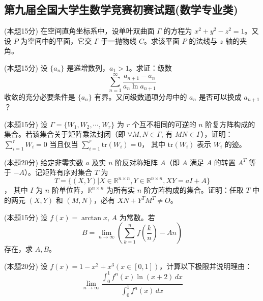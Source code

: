 \documentclass[loose]{ExBook}
\begin{document}
\subsection{第九届全国大学生数学竞赛初赛试题(数学专业类)}
\begin{qitems}
    \begin{bbox}
        \qitem (本题15分) 在空间直角坐标系中，设单叶双曲面 \(\Gamma\) 的方程为 \(x^2 + y^2 - z^2 = 1\)。又设 \(P\) 为空间中的平面，它交 \(\Gamma\) 于一抛物线 \(C\)。求该平面 \(P\) 的法线与 \(z\) 轴的夹角。
    \end{bbox}

    \begin{bbox}
        \qitem (本题15分) 设 \(\{a_n\}\) 是递增数列，\(a_1 > 1\)。求证：级数 
        \[ 
        \sum_{n=1}^{\infty} \frac{a_{n+1} - a_n}{a_n \ln a_{n+1}} 
        \] 
        收敛的充分必要条件是 \(\{a_n\}\) 有界。又问级数通项分母中的 \(a_n\) 是否可以换成 \(a_{n+1}\)？
    \end{bbox}

    \begin{bbox}
        \qitem (本题15分) 设 \(\Gamma = \{W_1, W_2, \cdots, W_r\}\) 为 \(r\) 个互不相同的可逆的 \(n\) 阶复方阵构成的集合。若该集合关于矩阵乘法封闭（即 \(\forall M, N \in \Gamma\), 有 \(MN \in \Gamma\)），证明：
        \( 
        \sum_{i=1}^{r} W_i = 0 
        \)
        当且仅当 
        \(
        \sum_{i=1}^{r} \mathrm{tr}(W_i) = 0 
        \)，
        其中 \(\mathrm{tr}(W_i)\) 表示 \(W_i\) 的迹。
    \end{bbox}

    \begin{bbox}
        \qitem (本题20分) 给定非零实数 \(a\) 及实 \(n\) 阶反对称矩阵 \(A\)（即 \(A\) 满足 \(A\) 的转置 \(A^T\) 等于 \(-A\)）。记矩阵有序对集合 \(T\) 为 
        \[ 
        T = \{(X, Y) | X \in \mathbb{R}^{n \times n}, Y \in \mathbb{R}^{n \times n}, XY = aI + A\}
        \]，
        其中 \(I\) 为 \(n\) 阶单位阵，\(\mathbb{R}^{n \times n}\) 为所有实 \(n\) 阶方阵构成的集合。证明：任取 \(T\) 中的两元 \((X, Y)\) 和 \((M, N)\)，必有 \(XN + Y^T M^T \neq O\)。
    \end{bbox}

    \begin{bbox}
        \qitem (本题15分) 设 \(f(x) = \arctan x\), \(A\) 为常数。若 
        \[
        B = \lim\limits_{n \to \infty} \left( \sum_{k=1}^{n} f\left(\frac{k}{n}\right) - An \right)
        \]
        存在，求 \(A, B\)。
    \end{bbox}

    \begin{bbox}
        \qitem (本题20分) 设 \(f(x) = 1 - x^2 + x^3 (x \in [0, 1])\)，计算以下极限并说明理由：
        \[
        \lim\limits_{n \to \infty} \frac{\displaystyle\int_{0}^{1} f^n(x) \ln (x + 2) \, dx}{\displaystyle\int_{0}^{1} f^n(x) \, dx}
        \]
    \end{bbox}
\end{qitems}
\end{document}
